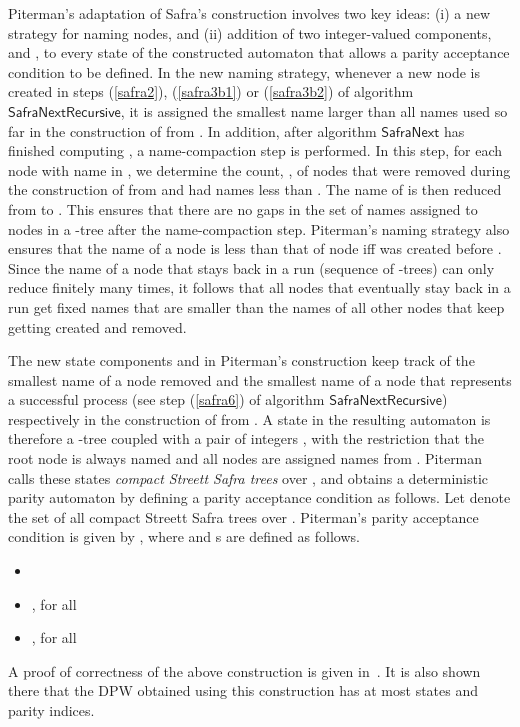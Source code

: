 \documentclass[3p]{elsarticle}
\newcommand{\algo}[1]{\ensuremath{\textsf{{#1}}}}
\begin{document}
Piterman's adaptation of Safra's construction involves two key ideas:
(i) a new strategy for naming nodes, and (ii) addition of two
integer-valued components,  and , to every state of the
constructed automaton that allows a parity acceptance condition to be
defined.  In the new naming strategy, whenever a new node is created
in steps (\ref{safra2}), (\ref{safra3b1}) or (\ref{safra3b2}) of
algorithm \algo{SafraNextRecursive}, it is assigned the smallest name
larger than all names used so far in the construction of  from
.  In addition, after algorithm \algo{SafraNext} has finished
computing , a name-compaction step is performed.  In this step,
for each node  with name  in , we determine the count,
, of nodes that were removed during the construction
of  from  and had names less than .  The name of  is then
reduced from  to .  This ensures that there
are no gaps in the set of names assigned to nodes in a -tree
after the name-compaction step.  Piterman's naming strategy also
ensures that the name of a node  is less than that of node  iff
 was created before .  Since the name of a node that stays back
in a run (sequence of -trees) can only reduce finitely many
times, it follows that all nodes that eventually stay back in a run
get fixed names that are smaller than the names of all other nodes
that keep getting created and removed.

The new state components  and  in Piterman's construction keep
track of the smallest name of a node removed and the smallest name of
a node that represents a successful process (see step (\ref{safra6})
of algorithm \algo{SafraNextRecursive}) respectively in the
construction of  from .  A state in the resulting automaton is
therefore a -tree coupled with a pair of integers , with the restriction that the root
node is always named  and all nodes are assigned names from .  Piterman calls these states \emph{compact
  Streett Safra trees} over , and obtains a deterministic parity
automaton by defining a parity acceptance condition as follows.  Let
 denote the set of all compact Streett Safra trees over .
Piterman's parity acceptance condition is given by , where 
and s are defined as follows.
\begin{itemize}
\item  
\item ,
  for all 
\item , for
  all 
\end{itemize}
A proof of correctness of the above construction is given
in~\cite{piterman}.  It is also shown there that the DPW obtained
using this construction has at most  states and 
parity indices.
\end{document}
